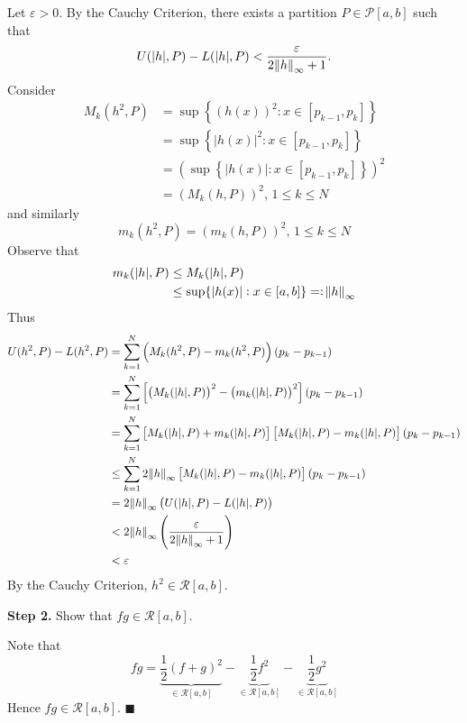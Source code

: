 \documentclass[11pt]{article}
\theoremstyle{definition}
\begin{document}
Let $\varepsilon > 0$. By the Cauchy Criterion, there exists a partition $P \in \mathcal{P}[a, b]$ such that
$$U(|h|, P) - L(|h|, P) < \frac{\varepsilon}{2\norm{h}_\infty + 1} \text{.}$$
Consider
\begin{align*}
M_k(h^2, P) & = \sup\left\{\left(h(x)\right)^2 : x \in [p_{k-1}, p_k]\right\} \\
& = \sup\left\{|h(x)|^2 : x \in [p_{k-1}, p_k]\right\} \\
& = \left( \sup\left\{|h(x)| : x \in [p_{k-1}, p_k]\right\}\right)^2 \\
& = \left(M_k(h, P)\right)^2, \hspace{2pt} 1 \leq k \leq N
\end{align*}
and similarly
$$m_k(h^2, P) = \left(m_k(h, P)\right)^2, \hspace{2pt} 1 \leq k \leq N$$
Observe that
\begin{align*}
m_k(|h|, P) & \leq M_k(|h|, P) \\
& \leq \sup\{|h(x)| : x \in [a, b]\} =: \norm{h}_\infty
\end{align*}
Thus
\begin{align*}
U(h^2, P) - L(h^2, P) & = \sum_{k=1}^N \left(M_k(h^2, P) - m_k(h^2, P)\right)(p_k - p_{k-1}) \\
& = \sum_{k=1}^N \left[\left(M_k(|h|, P)\right)^2 - \left(m_k(|h|, P)\right)^2\right](p_k - p_{k-1}) \\
& = \sum_{k=1}^N \left[M_k(|h|, P) + m_k(|h|, P)\right]\left[M_k(|h|, P) - m_k(|h|, P)\right](p_k - p_{k-1}) \\
& \leq \sum_{k=1}^N 2\norm{h}_\infty \left[M_k(|h|, P) - m_k(|h|, P)\right](p_k - p_{k-1}) \\
& = 2\norm{h}_\infty \left(U(|h|, P) - L(|h|, P)\right) \\
& < 2\norm{h}_\infty \left(\frac{\varepsilon}{2\norm{h}_\infty + 1}\right) \\
& < \varepsilon
\end{align*}
By the Cauchy Criterion, $h^2 \in \mathcal{R}[a, b]$. 

\textbf{Step 2.} Show that $fg \in \mathcal{R}[a, b]$. 

Note that
$$fg = \underbrace{\frac12(f+g)^2}_{\in \mathcal{R}[a, b]} - \underbrace{\frac12f^2}_{\in \mathcal{R}[a, b]} - \underbrace{\frac12g^2}_{\in \mathcal{R}[a, b]}$$
Hence $fg \in \mathcal{R}[a, b]$. $\blacksquare$
\end{document}
